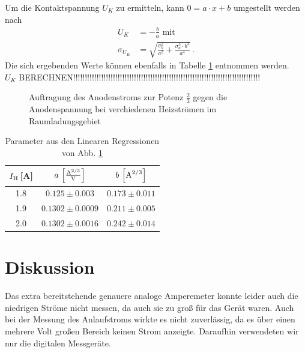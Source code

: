 \documentclass[12pt,a4paper,titlepage,headinclude,bibtotoc]{scrartcl}
\begin{document}
Um die Kontaktspannung $U_K$ zu ermitteln, kann $0=a\cdot x + b$ umgestellt werden nach 
\begin{align*}
U_K &= -\frac{b}{a} \text{ mit}\\
\sigma_{U_K} &= \sqrt{\frac{\sigma_b^2}{a^2}+\frac{\sigma_a^2 \cdot b^2}{a^4}}\, .
\end{align*}
Die sich ergebenden Werte können ebenfalls in Tabelle \ref{tab:ParaRaum} entnommen werden.\\



$U_K$ BERECHNEN!!!!!!!!!!!!!!!!!!!!!!!!!!!!!!!!!!!!!!!!!!!!!!!!!!!!!!!!!!!!!!!!!!!!!!!!!!!!!!!!


\begin{figure}[h]
   \centering
   \hfill
   \hfill
   \caption{Auftragung des Anodenstroms zur Potenz $\frac{2}{3}$ gegen die Anodenspannung bei verchiedenen Heizströmen im Raumladungsgebiet}
   \label{fig:raumladung}
 \end{figure}

\begin{table}[!h]
\centering
\begin{tabular}{|c|c|c|}
\hline
$I_\text H\,$[A]& $a\,\left[\frac{\text A^{2/3}}{\text V}\right]$	& $b\,\left[\text A^{2/3}\right]$			\\\hline\hline
1.8 		& $0.125\pm 0.003$		& $0.173\pm 0.011$	\\\hline
1.9 		& $0.1302\pm0.0009$ 	& $0.211\pm 0.005$	\\\hline
2.0 		& $0.1302\pm 0.0016$	& $0.242 \pm 0.014$	\\\hline
\end{tabular}
\caption{Parameter aus den Linearen Regressionen von Abb. \ref{fig:raumladung}}
\label{tab:ParaRaum}
\end{table}


\section{Diskussion}
\label{sec:diskussion}
Das extra bereitstehende genauere analoge Amperemeter konnte leider auch die niedrigen Ströme nicht messen, da auch sie zu groß für das Gerät waren.
Auch bei der Messung des Anlaufstroms wirkte es nicht zuverlässig, da es über einen mehrere Volt großen Bereich keinen Strom anzeigte.
Daraufhin verwendeten wir nur die digitalen Messgeräte.
\end{document}
